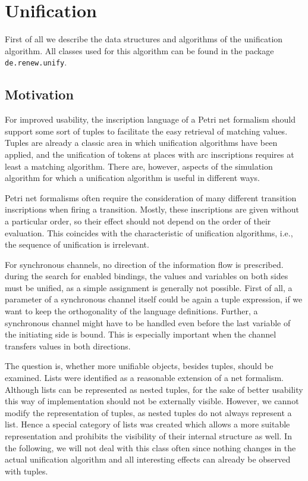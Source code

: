 \section{Unification}

First of all we describe the data structures and algorithms of
the unification algorithm. All classes used for this algorithm 
can be found in the package \texttt{de.renew.unify}.

\subsection{Motivation}

For improved usability, the inscription
language of a Petri net formalism should support some sort of tuples to 
facilitate the easy retrieval of matching values. Tuples are already 
a classic area in which unification algorithms have been applied, 
and the unification of tokens at places with arc inscriptions 
requires at least a matching algorithm. There are, however, 
aspects of the simulation algorithm for which a unification 
algorithm is useful in different ways.  

Petri net formalisms often require the consideration of 
many different transition inscriptions when firing a transition. 
Mostly, these inscriptions are given without a particular order, so their 
effect should not depend on the order of their evaluation. 
This coincides with the characteristic of unification algorithms, 
i.e., the sequence of unification is irrelevant.

For synchronous channels, no direction of the information flow 
is prescribed. during the search for enabled 
bindings, the values and variables on both sides must be unified, 
as a simple assignment is generally not possible. First of all,
a parameter of a synchronous channel itself could be again a 
tuple expression, if we want to keep the orthogonality of the 
language definitions. Further, a synchronous channel might have to be
handled even before the last variable of the initiating side
is bound. This is especially important when the channel transfers
values in both directions.  

The question is, whether more unifiable objects, besides tuples, 
should be examined. Lists were identified as a reasonable 
extension of a net formalism. Although lists can be represented 
as nested tuples, for the sake of better usability this way 
of implementation should not be externally visible. However, 
we cannot modify the representation of tuples, as nested tuples 
do not always represent a list. Hence a special category of 
lists was created which allows a more suitable representation 
and prohibits the visibility of their internal structure as well. 
In the following, we will not deal with this class often since 
nothing changes in the actual unification algorithm and all 
interesting effects can already be observed with tuples.   

